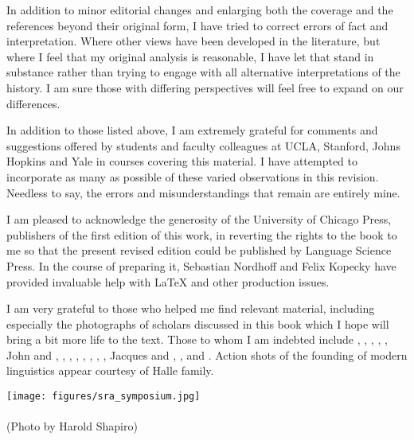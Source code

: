 In addition to minor editorial changes and enlarging both the coverage
and the references beyond their original form, I have tried to correct
errors of fact and interpretation. Where other views have been
developed in the literature, but where I feel that my original
analysis is reasonable, I have let that stand in substance rather than
trying to engage with all alternative interpretations of the
history. I am sure those with differing perspectives will feel free to
expand on our differences.

In addition to those listed above, I am extremely grateful for
comments and suggestions offered by students and faculty colleagues at
UCLA, Stanford, Johns Hopkins and Yale in courses covering this
material. I have attempted to incorporate as many as possible of these
varied observations in this revision. Needless to say, the errors and
misunderstandings that remain are entirely mine.

I am pleased to acknowledge the generosity of the University of
Chicago Press, publishers of the first edition of this work, in
reverting the rights to the book to me so that the present revised
edition could be published by Language Science Press. In the course of preparing it, Sebastian Nordhoff and Felix Kopecky have provided invaluable help with LaTeX and other production issues.

I am very grateful to those who helped me find relevant material,
including especially the photographs of scholars discussed in this
book which I hope will bring a bit more life to the text. Those to
whom I am indebted include , , ,
, , John and , , , , , , , , Jacques and , , 
and . Action shots of the founding of modern linguistics
appear
courtesy of Halle family.\\[3ex]



\begin{center}
  \texttt{[image: figures/sra\_symposium.jpg]}\\
  \\(Photo by Harold Shapiro)
\end{center}

